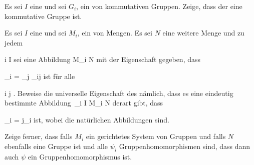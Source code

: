 {}
{





Es sei $I$ eine
und sei $G_i$,
 ein
von kommutativen Gruppen. Zeige, dass der
eine kommutative Gruppe ist.





}
{} {}

{}
{





Es sei $I$ eine
und sei $M_i$,
 ein
von Mengen. Es sei $N$ eine weitere Menge und zu jedem

\mavergleichskette
{\vergleichskette
{ i
}
{ \in }{ I
}
{  }{
}
{    }{
}
{   }{
}
}
{}{}{}
sei eine Abbildung
 { M_i } { N
} {}
mit der Eigenschaft gegeben, dass

\mavergleichskette
{\vergleichskette
{ \psi_i
}
{ = }{ \psi_j \circ \varphi_{ij}
}
{  }{
}
{    }{
}
{   }{
}
}
{}{}{}
ist für alle

\mavergleichskette
{\vergleichskette
{ i
}
{ \preccurlyeq }{ j
}
{  }{
}
{    }{
}
{   }{
}
}
{}{}{}
 {} {.}
Beweise die universelle Eigenschaft des
nämlich, dass es eine eindeutig bestimmte Abbildung
\maabbdisp {\psi} { \,_{i \in I} M_i  } { N
} {}
derart gibt, dass

\mavergleichskette
{\vergleichskette
{ \psi_i
}
{ = }{ \psi  \circ j_i
}
{  }{
}
{    }{
}
{   }{
}
}
{}{}{}
ist, wobei
 die natürlichen Abbildungen sind.

Zeige ferner, dass falls $M_i$ ein gerichtetes System von Gruppen und falls $N$ ebenfalls eine Gruppe ist und alle $\psi_i$ Gruppenhomomorphismen sind, dass dann auch $\psi$ ein Gruppenhomomorphismus ist.





}
{} {}







